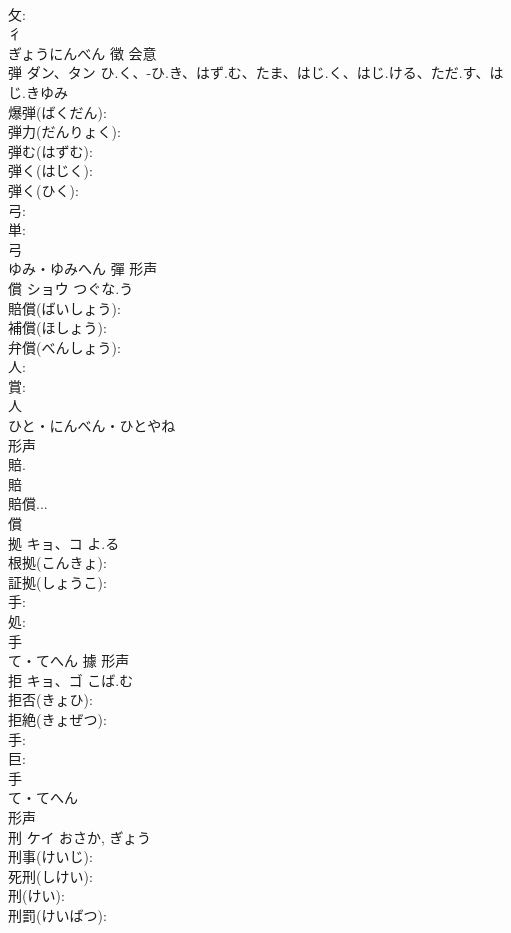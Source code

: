 \documentclass[8pt]{extreport}
\begin{document}
\begin{CJK}{UTF8}{min}
\\	攵: 
\\	彳	
\\	ぎょうにんべん	徵	会意 
\\	弾	ダン、タン	ひ.く、-ひ.き、はず.む、たま、はじ.く、はじ.ける、ただ.す、はじ.きゆみ		
\\	爆弾(ばくだん): 
\\	弾力(だんりょく): 
\\	弾む(はずむ): 
\\	弾く(はじく): 
\\	弾く(ひく): 
\\	弓: 
\\	単: 
\\	弓	
\\	ゆみ・ゆみへん	彈	形声 
\\	償	ショウ	つぐな.う		
\\	賠償(ばいしょう): 
\\	補償(ほしょう): 
\\	弁償(べんしょう): 
\\	人: 
\\	賞: 
\\	人	
\\	ひと・にんべん・ひとやね	
\\	形声 
\\	賠. 
\\	賠 
\\	賠償... 
\\	償 
\\	拠	キョ、コ	よ.る		
\\	根拠(こんきょ): 
\\	証拠(しょうこ): 
\\	手: 
\\	処: 
\\	手	
\\	て・てへん	據	形声 
\\	拒	キョ、ゴ	こば.む		
\\	拒否(きょひ): 
\\	拒絶(きょぜつ): 
\\	手: 
\\	巨: 
\\	手	
\\	て・てへん	
\\	形声 
\\	刑	ケイ		おさか, ぎょう	
\\	刑事(けいじ): 
\\	死刑(しけい): 
\\	刑(けい): 
\\	刑罰(けいばつ): 

\end{CJK}
\end{document}
